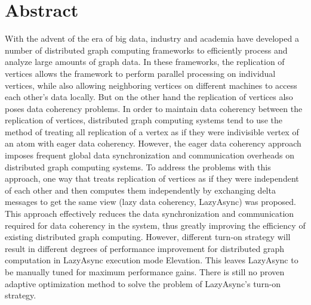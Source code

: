 \intobmk\chapter*{Abstract}%

With the advent of the era of big data, industry and academia have developed a number of distributed graph computing frameworks to efficiently process and analyze large amounts of graph data.
In these frameworks, the replication of vertices allows the framework to perform parallel processing on individual vertices, while also allowing neighboring vertices on different machines to access each other's data locally.
But on the other hand the replication of vertices also poses data coherency problems.
In order to maintain data coherency between the replication of vertices, distributed graph computing systems tend to use the method of treating all  replication of a vertex as if they were indivisible vertex of an atom with eager data coherency.
However, the eager data coherency approach imposes frequent global data synchronization and communication overheads on distributed graph computing systems.
To address the problems with this approach, one way that treats replication of vertices as if they were independent of each other and then computes them independently by exchanging delta messages to get the same view (lazy data coherency, LazyAsync) was proposed.
This approach effectively reduces the data synchronization and communication required for data coherency in the system, thus greatly improving the efficiency of existing distributed graph computing.
However, different turn-on strategy will result in different degrees of performance improvement for distributed graph computation in LazyAsync execution mode Elevation.
This leaves LazyAsync to be manually tuned for maximum performance gains.
There is still no proven adaptive optimization method to solve the problem of LazyAsync's turn-on strategy.


